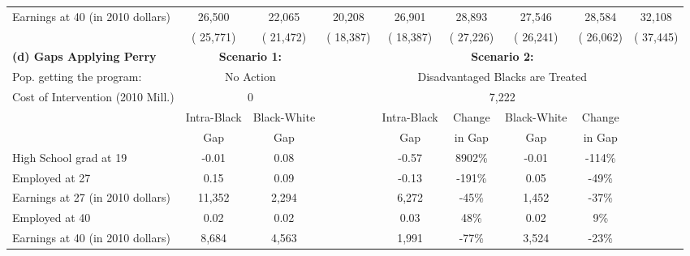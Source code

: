 \begin{table}[htbp]
\begin{center}
\begin{tabular}{lcccccccc}
Earnings at 40 (in 2010 dollars) &       26,500 &       22,065 &       20,208 &       26,901 &       28,893 &       27,546 &       28,584 &       32,108 \\[0.05cm]  
 & (      25,771) & (      21,472) & (      18,387) & (      18,387) & (      27,226) & (      26,241) & (      26,062) & (      37,445)   \\[0.2cm]  
\hline \hline
\textbf{(d) Gaps Applying Perry} & \multicolumn{2}{c}{\textbf{Scenario 1:}} &  &\multicolumn{4}{c}{\textbf{Scenario 2:}}   \\[0.2cm]  
 Pop. getting the program: & \multicolumn{2}{c}{No Action}   &  &\multicolumn{4}{c}{Disadvantaged Blacks are Treated}   \\[0.02cm]  
Cost of Intervention (2010 Mill.) &\multicolumn{2}{c}{ 0 } &
 &\multicolumn{4}{c}{       7,222} &
 \\[0.2cm]  
\hline
&Intra-Black &Black-White & &Intra-Black &Change &Black-White &Change  \\[0.02cm] 
&Gap &Gap & &Gap &in Gap &Gap &in Gap  \\[0.01cm] 
\hline
High School grad at 19 &       -0.01&        0.08&&       -0.57&        8902\% &       -0.01&        -114\% &
 \\[0.2cm]  
Employed at 27 &        0.15&        0.09&&       -0.13&        -191\% &        0.05&         -49\% &
 \\[0.2cm]  
Earnings at 27 (in 2010 dollars) &      11,352&       2,294&&       6,272&         -45\% &       1,452&         -37\% &
 \\[0.2cm]  
Employed at 40 &        0.02&        0.02&&        0.03&          48\% &        0.02&           9\% &
 \\[0.2cm]  
Earnings at 40 (in 2010 dollars) &       8,684&       4,563&&       1,991&         -77\% &       3,524&         -23\% &
 \\[0.2cm]  
  \hline \hline    \end{tabular}
 \end{center} 
       {\scriptsize  
       {\raggedright 
}}
\end{table}
